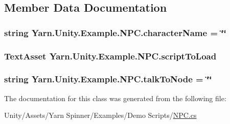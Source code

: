 \subsection{Member Data Documentation}
\hypertarget{a00071_a418ea7095bd8201559ed392f07905ca3}{
\subsubsection[{character\-Name}]{\setlength{\rightskip}{0pt plus 5cm}string Yarn.\-Unity.\-Example.\-N\-P\-C.\-character\-Name = \char`\"{}\char`\"{}}}\label{a00071_a418ea7095bd8201559ed392f07905ca3}
\hypertarget{a00071_a63145fb6ddf357e604d71bac04ca8a60}{
\subsubsection[{script\-To\-Load}]{\setlength{\rightskip}{0pt plus 5cm}Text\-Asset Yarn.\-Unity.\-Example.\-N\-P\-C.\-script\-To\-Load}}\label{a00071_a63145fb6ddf357e604d71bac04ca8a60}
\hypertarget{a00071_a64f4f1fb66b2046a674e3ebf3b9fdb56}{
\subsubsection[{talk\-To\-Node}]{\setlength{\rightskip}{0pt plus 5cm}string Yarn.\-Unity.\-Example.\-N\-P\-C.\-talk\-To\-Node = \char`\"{}\char`\"{}}}\label{a00071_a64f4f1fb66b2046a674e3ebf3b9fdb56}


The documentation for this class was generated from the following file\-:\begin{DoxyCompactItemize}
\item 
Unity/\-Assets/\-Yarn Spinner/\-Examples/\-Demo Scripts/\hyperlink{a00133}{N\-P\-C.\-cs}\end{DoxyCompactItemize}
